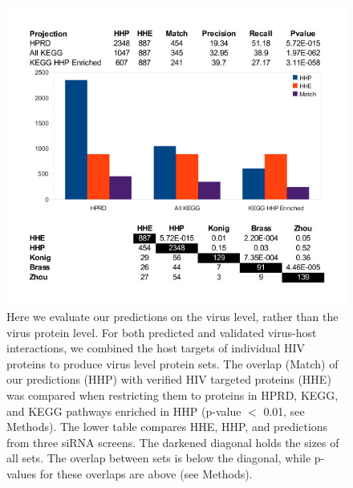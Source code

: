 

\begin{figure}
\begin{center}
\includegraphics[scale=2.25]{figs/medGen_7}
\end{center}
\caption[Comparison of combined predicted and validated virus-host
  interactions]{\small Here we evaluate our predictions on the virus
  level, rather than the virus protein level. For both predicted and
  validated virus-host interactions, we combined the host targets of
  individual HIV proteins to produce virus level protein sets. The
  overlap (Match) of our predictions (HHP) with verified HIV targeted
  proteins (HHE) was compared when restricting them to proteins in
  HPRD, KEGG, and KEGG pathways enriched in HHP (p-value $<$ 0.01, see
  Methods). The lower table compares HHE, HHP, and predictions from
  three siRNA screens. The darkened diagonal holds the sizes of all
  sets. The overlap between sets is below the diagonal, while p-values
  for these overlaps are above (see Methods). \label{fig:medGen:fig7}}
\end{figure}

